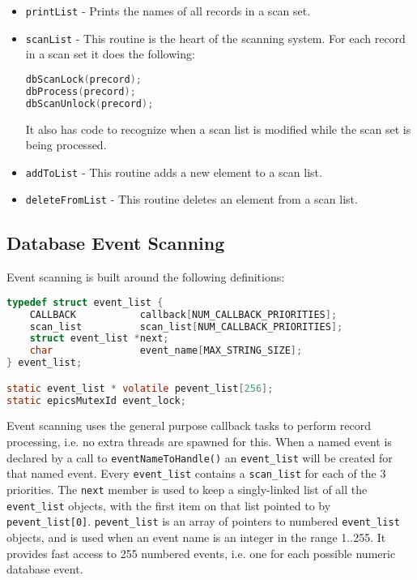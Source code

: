 \begin{itemize}
\item \verb|printList| - Prints the names of all records in a scan set.

\item \verb|scanList| - This routine is the heart of the scanning system.
For each record in a scan set it does the following:

\begin{lstlisting}[language=C]
dbScanLock(precord);
dbProcess(precord);
dbScanUnlock(precord);
\end{lstlisting}

It also has code to recognize when a scan list is modified while the scan set is being processed.

\item \verb|addToList| - This routine adds a new element to a scan list.

\item \verb|deleteFromList| - This routine deletes an element from a scan list.

\end{itemize}

\subsection{Database Event Scanning}

Event scanning is built around the following definitions:

\begin{lstlisting}[language=C]
typedef struct event_list {
    CALLBACK           callback[NUM_CALLBACK_PRIORITIES];
    scan_list          scan_list[NUM_CALLBACK_PRIORITIES];
    struct event_list *next;
    char               event_name[MAX_STRING_SIZE];
} event_list;

static event_list * volatile pevent_list[256];
static epicsMutexId event_lock;
\end{lstlisting}

Event scanning uses the general purpose callback tasks to perform record processing, i.e. no extra threads are spawned for this.
When a named event is declared by a call to \verb|eventNameToHandle()| an \verb|event_list| will be created for that named event.
Every \verb|event_list| contains a \verb|scan_list| for each of the 3 priorities.
The \verb|next| member is used to keep a singly-linked list of all the \verb|event_list| objects, with the first item on that list pointed to by \verb|pevent_list[0]|.
\verb|pevent_list| is an array of pointers to numbered \verb|event_list| objects, and is used when an event name is an integer in the range 1..255.
It provides fast access to 255 numbered events, i.e. one for each possible numeric database event.


